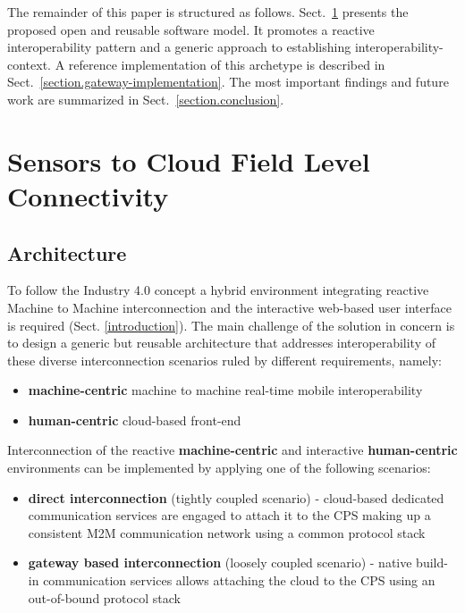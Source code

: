 \documentclass[runningheads]{llncs}
\begin{document}
The remainder of this paper is structured as follows. Sect.~\ref{cloud-to-sensors-field-level-connectivity} presents the proposed open and reusable software model. It promotes a reactive interoperability pattern and a generic approach to establishing interoperability-context. A reference implementation of this archetype is described in Sect.~\ref{section.gateway-implementation}. The most important findings and future work are summarized in Sect.~\ref{section.conclusion}.

\section{Sensors to Cloud Field Level Connectivity}\label{cloud-to-sensors-field-level-connectivity}

\subsection{Architecture}\label{subs.architecture}

To follow the Industry 4.0 concept a hybrid environment integrating reactive Machine to Machine interconnection and the interactive web-based user interface is required (Sect. \ref{introduction}). The main challenge of the solution in concern is to design a generic but reusable architecture that addresses interoperability of these diverse interconnection scenarios ruled by different requirements, namely:

\begin{itemize}
      \item \textbf{machine-centric} machine to machine real-time mobile interoperability
      \item \textbf{human-centric} cloud-based front-end
\end{itemize}

Interconnection of the reactive \textbf{machine-centric} and interactive \textbf{human-centric} environments can be implemented by applying one of the following scenarios:

\begin{itemize}
      \item \textbf{direct interconnection} (tightly coupled scenario) - cloud-based dedicated communication services are engaged to attach it to the CPS making up a consistent M2M communication network using a common protocol stack
      \item \textbf{gateway based interconnection} (loosely coupled scenario) - native build-in communication services allows attaching the cloud to the CPS using an out-of-bound protocol stack
\end{itemize}
\end{document}
